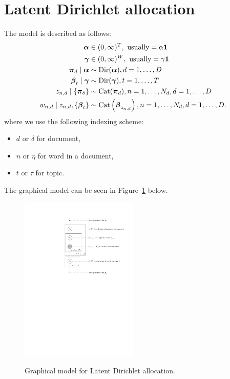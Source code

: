 \section{Latent Dirichlet allocation}
The model is described as follows:
\begin{align}
    \boldsymbol{\mathbf{\alpha}}                                 &\in (0, \infty)^T, \text{ usually} = \alpha\boldsymbol{\mathbf{1}} \\
    \boldsymbol{\mathbf{\gamma}}                                 &\in (0, \infty)^W, \text{ usually} = \gamma\boldsymbol{\mathbf{1}} \\
    \boldsymbol{\mathbf{\pi}}_d \mid \boldsymbol{\mathbf{\alpha}}               &\sim \operatorname{Dir}(\boldsymbol{\mathbf{\alpha}}), d = 1, \dotsc, D \\
    \boldsymbol{\mathbf{\beta}}_t \mid \boldsymbol{\mathbf{\gamma}}             &\sim \operatorname{Dir}(\boldsymbol{\mathbf{\gamma}}), t = 1, \dotsc, T \\
    z_{n, d} \mid \{\boldsymbol{\mathbf{\pi}}_{\delta}\}        &\sim \operatorname{Cat}(\boldsymbol{\mathbf{\pi}}_d), n = 1, \dotsc, N_d, d = 1, \dotsc, D \\
    w_{n, d} \mid z_{n, d}, \{\boldsymbol{\mathbf{\beta}}_t\}  &\sim \operatorname{Cat}\left(\boldsymbol{\mathbf{\beta}}_{z_{n, d}}\right), n = 1, \dotsc, N_d, d = 1, \dotsc, D.
\end{align}
where we use the following indexing scheme:
\begin{itemize}
    \item $d$ or $\delta$ for document,
    \item $n$ or $\eta$ for word in a document,
    \item $t$ or $\tau$ for topic.
\end{itemize}
The graphical model can be seen in Figure~\ref{fig:models/lda/figures/lda} below.
\begin{figure}[htb!]
    \centering
        \includegraphics[width=0.5\textwidth]{models/lda/figures/lda}
    \label{fig:models/lda/figures/lda}
    \caption{Graphical model for Latent Dirichlet allocation.}
\end{figure}

